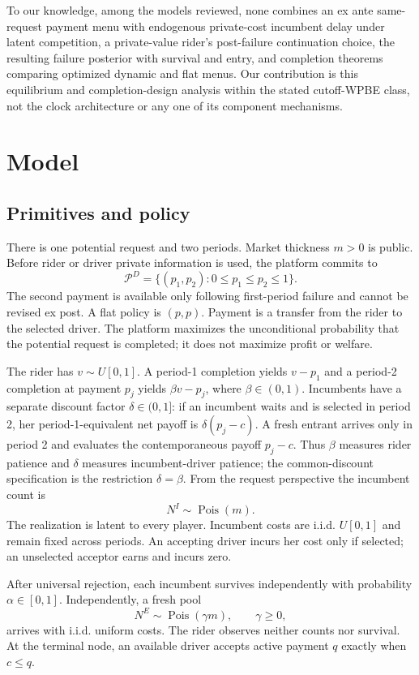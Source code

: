 \documentclass[mnsc,dblanonrev]{informs4}
\begin{document}
To our knowledge, among the models reviewed, none combines an ex ante
same-request payment menu with endogenous private-cost incumbent delay under
latent competition, a private-value rider's post-failure continuation choice,
the resulting failure posterior with survival and entry, and completion
theorems comparing optimized dynamic and flat menus.  Our contribution is this
equilibrium and completion-design analysis within the stated cutoff-WPBE class,
not the clock architecture or any one of its component mechanisms.

\section{Model}
\label{sec:model}

\subsection{Primitives and policy}

There is one potential request and two periods.  Market thickness $m>0$ is
public.  Before rider or driver private information is used, the platform
commits to
\[
 \mathcal P^D=\{(p_1,p_2):0\le p_1\le p_2\le1\}.
\]
The second payment is available only following first-period failure and
cannot be revised ex post.  A flat policy is $(p,p)$.  Payment is a transfer
from the rider to the selected driver.  The platform maximizes the
unconditional probability that the potential request is completed; it does
not maximize profit or welfare.

The rider has $v\sim U[0,1]$.  A period-1 completion yields $v-p_1$ and a
period-2 completion at payment $p_j$ yields $\beta v-p_j$, where
$\beta\in(0,1)$.  Incumbents have a separate discount factor
$\delta\in(0,1]$: if an incumbent waits and is selected in period 2, her
period-1-equivalent net payoff is $\delta(p_j-c)$.  A fresh entrant arrives
only in period 2 and evaluates the contemporaneous payoff $p_j-c$.  Thus
$\beta$ measures rider patience and $\delta$ measures incumbent-driver
patience; the common-discount specification is the restriction
$\delta=\beta$.  From the request perspective the incumbent count is
\[
 N^I\sim\operatorname{Pois}(m).
\]
The realization is latent to every player.  Incumbent costs are i.i.d.
$U[0,1]$ and remain fixed across periods.  An accepting driver incurs her cost
only if selected; an unselected acceptor earns and incurs zero.

After universal rejection, each incumbent survives independently with
probability $\alpha\in[0,1]$.  Independently, a fresh pool
\[
 N^E\sim\operatorname{Pois}(\gamma m),\qquad \gamma\ge0,
\]
arrives with i.i.d. uniform costs.  The rider observes neither counts nor
survival.  At the terminal node, an available driver accepts active payment
$q$ exactly when $c\le q$.
\end{document}
